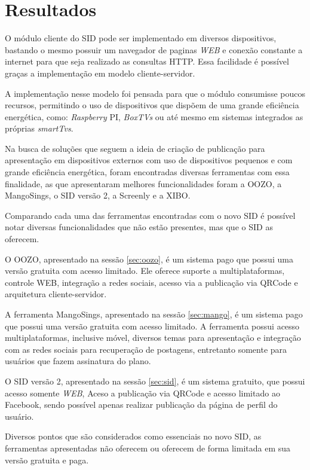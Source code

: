 \chapter[Resultados]{Resultados}

O módulo cliente do SID pode ser implementado em diversos dispositivos, bastando o mesmo possuir um navegador de paginas \textit{WEB} e conexão constante a internet para que seja realizado as consultas HTTP. Essa facilidade é possível graças a implementação em modelo cliente-servidor.

A implementação nesse modelo foi pensada para que o módulo consumisse poucos recursos, permitindo o uso de dispositivos que dispõem de uma grande eficiência energética, como: \textit{Raspberry} PI, \textit{BoxTVs} ou até mesmo em sistemas integrados as próprias \textit{smartTvs}.

Na busca de soluções que seguem a ideia de criação de publicação para apresentação em dispositivos externos com uso de dispositivos pequenos e com grande eficiência energética, foram encontradas diversas ferramentas com essa finalidade, as que apresentaram melhores funcionalidades foram a OOZO, a MangoSings, o SID versão 2, a Screenly e a XIBO.

Comparando cada uma das ferramentas encontradas com o novo SID é possível notar diversas funcionalidades que não estão presentes, mas que o SID as oferecem. 

O OOZO, apresentado na sessão \ref{sec:oozo}, é um sistema pago que possui  uma versão gratuita com acesso limitado. Ele oferece suporte a multiplataformas, controle WEB, integração a redes sociais, acesso via a publicação via QRCode e arquitetura cliente-servidor.

A ferramenta MangoSings, apresentado na sessão \ref{sec:mango}, é um sistema pago que possui uma versão gratuita com acesso limitado. A ferramenta possui acesso multiplataformas, inclusive móvel, diversos temas para apresentação e integração com as redes sociais para recuperação de postagens, entretanto somente para usuários que fazem assinatura do plano.

O SID versão 2, apresentado na sessão \ref{sec:sid}, é um sistema gratuito, que possui acesso somente \textit{WEB}, Aceso a publicação via QRCode e acesso limitado ao Facebook, sendo possível apenas realizar publicação da página de perfil do usuário.


Diversos pontos que são considerados como essenciais no novo SID, as ferramentas apresentadas não oferecem ou oferecem de forma limitada em sua versão gratuita e paga. 

